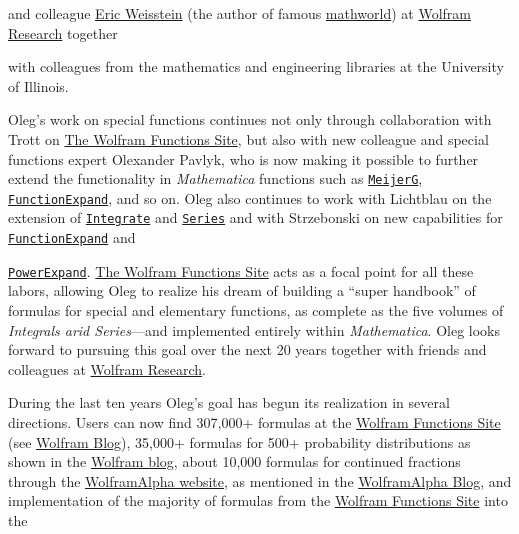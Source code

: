and colleague \href{http://www.ericweisstein.com/}{Eric Weisstein} (the author of famous \href{http://mathworld.wolfram.com/}{mathworld}) at \href{http://www.wolfram.com/}{Wolfram Research} together  

 with colleagues from the mathematics and engineering libraries at the University of Illinois.







Oleg's work on special functions continues not only through collaboration with Trott on \href{http://functions.wolfram.com/}{The Wolfram Functions Site}, but also with new colleague and special functions expert Olexander Pavlyk, who is now making it possible to further extend the functionality in \textit{Mathematica} functions such as \href{http://reference.wolfram.com/language/ref/MeijerG.html}{\texttt{MeijerG}}, \href{http://reference.wolfram.com/language/ref/FunctionExpand.html}{\texttt{FunctionExpand}}, and so on. Oleg also continues to work with Lichtblau on the extension of \href{http://reference.wolfram.com/language/ref/Integrate.html}{\texttt{Integrate}} and \href{http://reference.wolfram.com/language/ref/Series.html}{\texttt{Series}} and with Strzebonski on new capabilities for \href{http://reference.wolfram.com/language/ref/FunctionExpand.html}{\texttt{FunctionExpand}} and 

\href{http://reference.wolfram.com/language/ref/PowerExpand.html}{\texttt{PowerExpand}}.  \href{http://functions.wolfram.com}{The Wolfram Functions Site} acts as a focal point for all these labors, allowing Oleg to realize his dream of building a ``super handbook'' of formulas for special and elementary functions, as complete as the five volumes of \textit{Integrals arid Series}—and implemented entirely within \textit{Mathematica}. Oleg looks forward to pursuing this goal over the next 20 years together with friends and colleagues at \href{http://www.wolfram.com/}{Wolfram Research}.











During the last ten years Oleg's goal has begun its realization in several directions. Users can now find 307,000+ formulas at the \href{http://functions.wolfram.com}{Wolfram Functions Site} (see \href{http://blog.wolfram.com/2008/05/06/two-hundred-thousand-new-formulas-on-the-web}{Wolfram Blog}), 35,000+ formulas for 500+ probability distributions as shown in the \href{http://blog.wolfram.com/2013/02/01/the-ultimate-univariate-probability-distribution-explorer}{Wolfram blog}, about 10,000 formulas for continued fractions through the \href{http://www.wolframalpha.com}{WolframAlpha website}, as mentioned in the \href{http://blog.wolframalpha.com/2013/05/01/after-100-years-ramanujan-gap-filled/}{WolframAlpha  Blog}, and implementation of the majority of formulas from the \href{http://functions.wolfram.com}{Wolfram Functions Site} into the 

